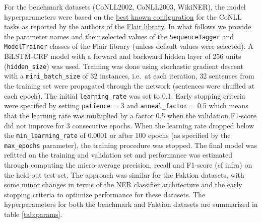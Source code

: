 \documentclass[12pt,a4paper,]{book}
\begin{document}
For the benchmark datasets (CoNLL2002, CoNLL2003, WikiNER), the model hyperparameters were based on the \href{https://github.com/flairNLP/flair/blob/master/resources/docs/EXPERIMENTS.md}{best known configuration} for the CoNLL tasks as reported by the authors of the \href{https://github.com/flairNLP/flair}{Flair library}. In what follows we provide the parameter names and their selected values of the \texttt{SequenceTagger} and \texttt{ModelTrainer} classes of the Flair library (unless default values were selected). A BiLSTM-CRF model with a forward and backward hidden layer of 256 units (\texttt{hidden\_size}) was used. Training was done using stochastic gradient descent with a \texttt{mini\_batch\_size} of 32 instances, i.e.~at each iteration, 32 sentences from the training set were propagated through the network (sentences were shuffled at each epoch). The initial \texttt{learning\_rate} was set to 0.1. Early stopping criteria were specified by setting \texttt{patience} = 3 and \texttt{anneal\_factor} = 0.5 which means that the learning rate was multiplied by a factor 0.5 when the validation F1-score did not improve for 3 consecutive epochs. When the learning rate dropped below the \texttt{min\_learning\_rate} of 0.0001 or after 100 epochs (as specified by the \texttt{max\_epochs} parameter), the training procedure was stopped. The final model was refitted on the training and validation set and performance was estimated through computing the micro-average precision, recall and F1-score (cf infra) on the held-out test set. The approach was similar for the Faktion datasets, with some minor changes in terms of the NER classifier architecture and the early stopping criteria to optimize performance for these datasets. The hyperparameters for both the benchmark and Faktion datasets are summarized in table \ref{tab:params}.
\end{document}
